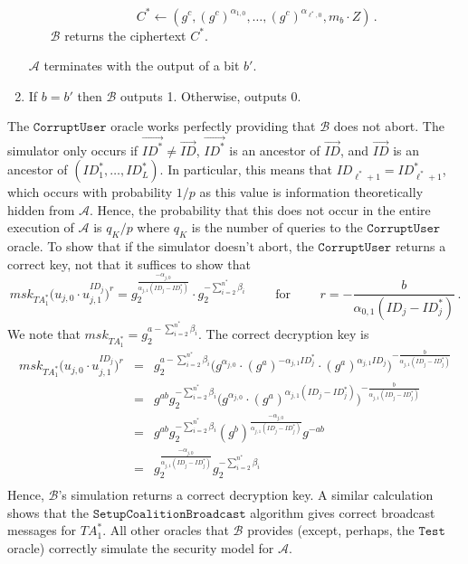 \documentclass{llncs}
\newcommand{\A}{\mathcal{A}}
\newcommand{\B}{\mathcal{B}}
\newcommand{\ID}{\mathit{ID}}
\newcommand{\TA}{\mathit{TA}}
\newcommand{\msk}{\mathit{msk}}
\begin{document}
\begin{enumerate}
\begin{itemize}
        \begin{displaymath}
        C^{*} \gets (g^{c},(g^{c})^{\alpha_{1,0}}, \ldots, (g^{c})^{\alpha_{\ell^{*},0}}, m_{b}\cdot Z) \, .
        \end{displaymath}
        $\B$ returns the ciphertext $C^{*}$.
    \end{itemize}
    $\A$ terminates with the output of a bit $b'$.
\item If $b=b'$ then $\B$ outputs 1. Otherwise, outputs 0.
\end{enumerate}

The $\texttt{CorruptUser}$ oracle works perfectly providing that $\B$ does not abort. The simulator only occurs if $\vec{\ID^{*}}\neq \vec{\ID}$, $\vec{\ID^{*}}$ is an ancestor of $\vec{\ID}$, and $\vec{\ID}$ is an ancestor of $(\ID^{*}_{1},\ldots,\ID^{*}_{L})$. In particular, this means that $\ID_{\ell^{*}+1} = \ID^{*}_{\ell^{*}+1}$, which occurs with probability $1/p$ as this value is information theoretically hidden from $\A$. Hence, the probability that this does not occur in the entire execution of $\A$ is $q_{K}/p$ where $q_{K}$ is the number of queries to the $\texttt{CorruptUser}$ oracle. To show that if the simulator doesn't abort, the $\texttt{CorruptUser}$ returns a correct key, not that it suffices to show that 
\begin{displaymath}
\msk_{\TA^{*}_{1}} \Big(u_{j,0}\cdot u_{j,1}^{\ID_{j}}\Big)^{r} = g_{2}^{\frac{-\alpha_{j,0}}{\alpha_{j,1}(\ID_{j}-\ID^{*}_{j})}} \cdot g_{2}^{-\sum_{i=2}^{n^{*}} \beta_{i}} \qquad \mbox{ for } \qquad r = -\frac{b}{\alpha_{0,1}(\ID_{j}-\ID^{*}_{j})}\, .
\end{displaymath}
We note that $\msk_{\TA^{*}_{1}} = g_{2}^{a-\sum_{i=2}^{n^{*}} \beta_{i}}$. The correct decryption key is
\begin{eqnarray*}
\msk_{\TA^{*}_{1}} \Big(u_{j,0}\cdot u_{j,1}^{\ID_{j}}\Big)^{r} &=& g_{2}^{a-\sum_{i=2}^{n^{*}} \beta_{i}} \Big( g^{\alpha_{j,0}} \cdot (g^{a})^{-\alpha_{j,1}\ID^{*}_{j}} \cdot (g^{a})^{\alpha_{j,1}\ID_{j}} \big)^{-\frac{b}{\alpha_{j,1}(\ID_{j}-\ID^{*}_{j})}}\\
&=& g^{ab} g_{2}^{-\sum_{i=2}^{n^{*}}\beta_{i}} \Big( g^{\alpha_{j,0}} \cdot (g^{a})^{\alpha_{j,1}(\ID_{j}-\ID^{*}_{j})} \Big)^{-\frac{b}{\alpha_{j,1}(\ID_{j}-\ID^{*}_{j})}} 
\\
&=& g^{ab} g_{2}^{-\sum_{i=2}^{n^{*}}\beta_{i}} (g^{b})^{\frac{-\alpha_{j,0}}{\alpha_{j,1}(\ID_{j}-\ID^{*}_{j})}}g^{-ab}\\
&=& g_{2}^{\frac{-\alpha_{j,0}}{\alpha_{j,1}(\ID_{j}-\ID^{*}_{j})}} g_{2}^{-\sum_{i=2}^{n^{*}}\beta_{i}}\\
\end{eqnarray*}
Hence, $\B$'s simulation returns a correct decryption key. A similar calculation shows that the $\texttt{SetupCoalitionBroadcast}$ algorithm gives correct broadcast messages for $\TA^{*}_{1}$. All other oracles that $\B$ provides (except, perhaps, the $\texttt{Test}$ oracle) correctly simulate the security model for $\A$.
\end{document}
